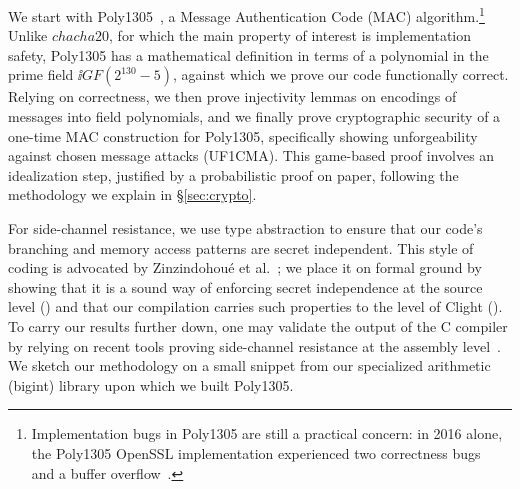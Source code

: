 We start with Poly1305~\cite{bernstein2005poly1305}, a Message
Authentication Code (MAC) algorithm.\footnote{Implementation bugs in
  Poly1305 are still a practical concern: in 2016 alone, the Poly1305 OpenSSL
  implementation experienced two correctness bugs~\cite{polybug,polybug2}
  and a buffer overflow~\cite{CVE7054}.}
%
%
Unlike \lst$chacha20$, for which
the main property of interest is implementation safety, Poly1305 has a
mathematical definition in terms of a polynomial in the prime field
$\ii{GF}(2^{130}-5)$, against which we prove our code functionally correct.
%
Relying on correctness, we then prove injectivity lemmas on encodings
of messages into field polynomials, and we finally prove
%
cryptographic security of a one-time MAC construction for Poly1305,
specifically showing unforgeability against chosen message attacks
(UF1CMA).
%
This game-based proof involves an idealization step, justified by a
probabilistic proof on paper, following the methodology we explain in
\S\ref{sec:crypto}.

For side-channel resistance, we use type abstraction to ensure that our
code's branching and memory access patterns are secret independent.
%
This style of \fstar{} coding is advocated by Zinzindohou{\'e} et
al.~\cite{ZBB16}; we place it on formal ground by showing that
it is a sound way of enforcing secret independence at the source level
() and that our compilation carries such properties to
the level of Clight ().
%
To carry our results further down, one may validate the output of the C
compiler by relying on recent tools proving side-channel resistance at
the assembly level~\cite{almeida-usenix2016, almeida16fse}.
%
We sketch our methodology on a small snippet from our
specialized arithmetic (bigint) library upon which we built Poly1305.

